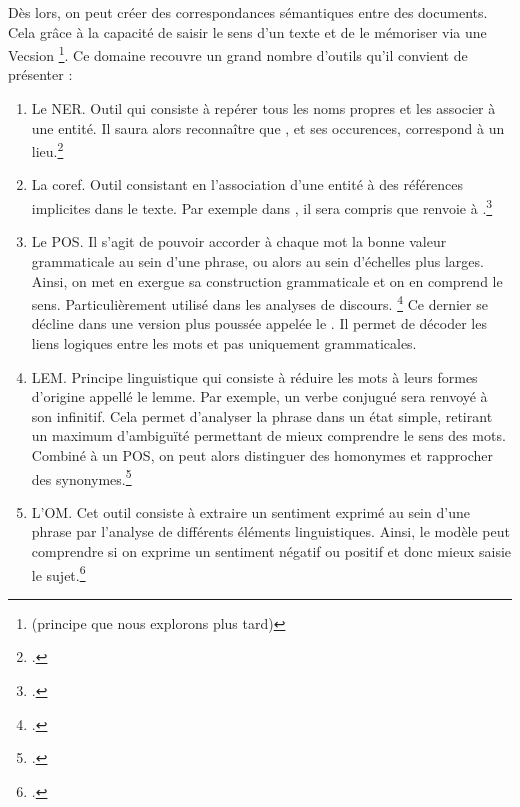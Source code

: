 Dès lors, on peut créer des correspondances sémantiques entre des documents. Cela grâce à la capacité de saisir le sens d'un texte et de le mémoriser via une \gls{Vecsion} \footnote{(principe que nous explorons plus tard)}. Ce domaine recouvre un grand nombre d'outils qu'il convient de présenter : 

\begin{enumerate}

	\item Le \gls{NER}. Outil qui consiste à repérer tous les noms propres et les associer à une entité. Il saura alors reconnaître que , et ses occurences, correspond à un lieu.\footcite{QuestCeQueNER}
	
	\item La \gls{coref}. Outil consistant en l'association d'une entité à des références implicites dans le texte. Par exemple dans , il sera compris que  renvoie à .\footcite{landraginAnaphoresCoreferencesAnalyse}
	
	\item Le \gls{POS}. Il s'agit de pouvoir accorder à chaque mot la bonne valeur grammaticale au sein d'une phrase, ou alors au sein d'échelles plus larges. Ainsi, on met en exergue sa construction grammaticale et on en comprend le sens. Particulièrement utilisé dans les analyses de discours. \footcite{kavlakogluQuestceQueRacinisation2025} Ce dernier se décline dans une version plus poussée appelée le . Il permet de décoder les liens logiques entre les mots et pas uniquement grammaticales.
	
	\item \Gls{LEM}. Principe linguistique qui consiste à réduire les mots à leurs formes d'origine appellé le lemme. Par exemple, un verbe conjugué sera renvoyé à son infinitif. Cela permet d'analyser la phrase dans un état simple, retirant un maximum d'ambiguïté permettant de mieux comprendre le sens des mots. Combiné à un \gls{POS}, on peut alors distinguer des homonymes et rapprocher des synonymes.\footcite{kavlakogluQuestceQueRacinisation2025}
	
	\item L'\gls{OM}. Cet outil consiste à extraire un sentiment exprimé au sein d'une phrase par l'analyse de différents éléments linguistiques. Ainsi, le modèle peut comprendre si on exprime un sentiment négatif ou positif et donc mieux saisie le sujet.\footcite{boullierOpinionMiningSentiment2012}

\end{enumerate}

